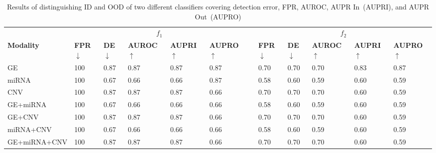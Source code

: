 \begin{table}
	\centering
	\caption[Results of distinguishing ID and OOD of different classifiers]{Results of distinguishing ID and OOD of two different classifiers covering detection error, FPR, AUROC, AUPR In~(AUPRI), and AUPR Out~(AUPRO)} 
	\vspace{-4mm}
	\begin{tabular}{llllllllllll}
		&\multicolumn{5}{c}{\bfseries{$f_1$}} && \multicolumn{5}{c}{\bfseries{$f_2$}} \\	
		\cmidrule{2-6}\cmidrule{8-12}   
		\textbf{Modality}&\textbf{FPR$\downarrow$} & \textbf{DE$\downarrow$} & \textbf{AUROC$\uparrow$} & \textbf{AUPRI$\uparrow$} & \textbf{AUPRO$\uparrow$}
		&& \textbf{FPR$\downarrow$} & \textbf{DE$\downarrow$} & \textbf{AUROC$\uparrow$} & \textbf{AUPRI$\uparrow$} & \textbf{AUPRO$\uparrow$}\\
		\hline
		\multirow{1}{*}{{GE}} & 100 & 0.87 & 0.87 & 0.87 & 0.87 && 0.70 & 0.70 & 0.70 & 0.83 & 0.87\\
		\hline
		\multirow{1}{*}{{miRNA}} & 100 & 0.67 & 0.66 & 0.66 & 0.87 && 0.58 & 0.60 & 0.59 & 0.60 & 0.59\\
		\hline
		\multirow{1}{*}{{CNV}} & 100 & 0.87 & 0.87 & 0.87 & 0.66 && 0.70 & 0.70 & 0.70 & 0.60 & 0.59\\
		\hline
		\multirow{1}{*}{{GE+miRNA}} & 100 & 0.67 & 0.66 & 0.66 & 0.66 && 0.58 & 0.60 & 0.59 & 0.60 & 0.59\\
		\hline
		\multirow{1}{*}{{GE+CNV}} & 100 & 0.87 & 0.87 & 0.87 & 0.66 && 0.70 & 0.70 & 0.70 & 0.60 & 0.59\\
		\hline
		\multirow{1}{*}{{miRNA+CNV}} & 100 & 0.67 & 0.66 & 0.66 & 0.66 && 0.58 & 0.60 & 0.59 & 0.60 & 0.59\\
		\hline
		\multirow{1}{*}{{GE+miRNA+CNV}} & 100 & 0.87 & 0.87 & 0.87 & 0.66 && 0.70 & 0.70 & 0.70 & 0.60 & 0.59\\
		\hline
	\end{tabular} %
	\vspace{-2mm}
	\label{Table:OOD_result_2}
\end{table}

